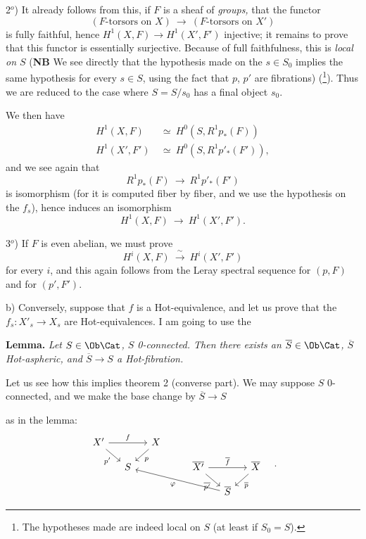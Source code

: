 2$^{o}$) It already follows from this, if $F$ is a sheaf of \textit{groups,} that the functor
\[
(F\text{-torsors on } X) \ \longrightarrow\ (F\text{-torsors on } X')
\]
is fully faithful, hence $H^1(X,F) \longrightarrow H^1(X',F')$ injective; it remains to prove that this functor is essentially surjective. Because of full faithfulness, this is \textit{local on $S$} (\textbf{NB} We see directly that the hypothesis made on the $s \in S_0$ implies the same hypothesis for every $s \in S$, using the fact that $p$, $p'$ are fibrations) (\footnote{The hypotheses made are indeed local on $S$ (at least if $S_0 = S$).}). Thus we are reduced to the case where $S = S/s_0$ has a final object $s_0$.



We then have
\[
\begin{aligned}
H^1(X,F) &\ \simeq\ H^0(S, R^1p_*(F)) \\
H^1(X',F') &\ \simeq\ H^0(S, R^1p'_*(F')),
\end{aligned}
\]
and we see again that
\[
R^1p_*(F) \ \longrightarrow\ R^1p'_*(F')
\]
is isomorphism (for it is computed fiber by fiber, and we use the hypothesis on the $f_s$), hence induces an isomorphism
\[
H^1(X,F) \ \longrightarrow\ H^1(X',F').
\]

3$^{o}$) If $F$ is even abelian, we must prove
\[
H^i(X,F) \ \xrightarrow{\ \sim\ }\ H^i(X',F')
\]
for every $i$, and this again follows from the Leray spectral sequence for $(p,F)$ and for $(p',F')$.

b) Conversely, suppose that $f$ is a Hot-equivalence, and let us prove that the $f_s : X'_s \longrightarrow X_s$ are Hot-equivalences. I am going to use the

\textbf{Lemma.} \textit{Let $S \in \Ob\Cat$, $S$ \textup{0}-connected. Then there exists an $\overline{S} \in \Ob\Cat$, $\overline{S}$ \textup{Hot}-aspheric, and $\overline{S} \longrightarrow S$ a \textup{Hot}-fibration.}

Let us see how this implies theorem 2 (converse part). We may suppose $S$ 0-connected, and we make the base change by $\overline{S} \longrightarrow S$


as in the lemma:
\[
\begin{tikzcd}[column sep=small, row sep=small]
X' \arrow[rr, "f"] \arrow[dr, "p'"'] & & X \arrow[dl, "p"] & & & & \\
& S & & & \overline{X'} \arrow[rr, "\overline{f}"] \arrow[dr, "\overline{p'}"'] & & \overline{X} \arrow[dl, "\overline{p}"] \\
& & & & & \overline{S} \arrow[ullll, "\varphi"] &
\end{tikzcd}
\quad .
\]

